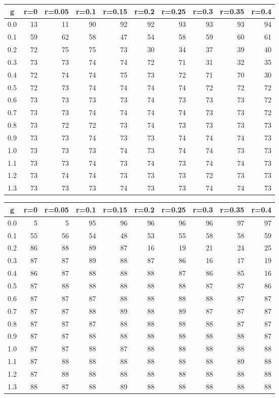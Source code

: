 %
\begin{table}[!tbp]
 \begin{center}
 \begin{tabular}{rrrrrrrrrr}\hline\hline
\multicolumn{1}{c}{g}&\multicolumn{1}{c}{r=0}&\multicolumn{1}{c}{r=0.05}&\multicolumn{1}{c}{r=0.1}&\multicolumn{1}{c}{r=0.15}&\multicolumn{1}{c}{r=0.2}&\multicolumn{1}{c}{r=0.25}&\multicolumn{1}{c}{r=0.3}&\multicolumn{1}{c}{r=0.35}&\multicolumn{1}{c}{r=0.4}\tabularnewline
\hline
0.0&13&11&90&92&92&93&93&93&94\tabularnewline
0.1&59&62&58&47&54&58&59&60&61\tabularnewline
0.2&72&75&75&73&30&34&37&39&40\tabularnewline
0.3&73&73&74&74&72&71&31&32&35\tabularnewline
0.4&72&74&74&75&73&72&71&70&30\tabularnewline
0.5&72&73&74&74&74&74&72&72&72\tabularnewline
0.6&73&73&73&73&74&73&73&73&72\tabularnewline
0.7&73&73&74&74&74&74&73&73&72\tabularnewline
0.8&73&72&72&73&74&73&73&73&73\tabularnewline
0.9&73&73&74&73&73&74&74&74&73\tabularnewline
1.0&73&73&73&74&73&74&74&73&73\tabularnewline
1.1&73&73&74&73&74&73&74&74&73\tabularnewline
1.2&73&74&74&73&73&73&72&73&73\tabularnewline
1.3&73&73&73&74&73&73&74&74&73\tabularnewline
\hline
\end{tabular}

\end{center}

\end{table}

%
\begin{table}[!tbp]
 \begin{center}
 \begin{tabular}{rrrrrrrrrr}\hline\hline
\multicolumn{1}{c}{g}&\multicolumn{1}{c}{r=0}&\multicolumn{1}{c}{r=0.05}&\multicolumn{1}{c}{r=0.1}&\multicolumn{1}{c}{r=0.15}&\multicolumn{1}{c}{r=0.2}&\multicolumn{1}{c}{r=0.25}&\multicolumn{1}{c}{r=0.3}&\multicolumn{1}{c}{r=0.35}&\multicolumn{1}{c}{r=0.4}\tabularnewline
\hline
0.0& 5& 5&95&96&96&96&96&97&97\tabularnewline
0.1&55&56&54&48&53&55&58&58&59\tabularnewline
0.2&86&88&89&87&16&19&21&24&25\tabularnewline
0.3&87&87&89&88&87&86&16&17&19\tabularnewline
0.4&86&87&88&88&88&87&86&85&16\tabularnewline
0.5&87&88&88&88&88&88&87&87&86\tabularnewline
0.6&87&87&87&88&88&88&88&87&87\tabularnewline
0.7&87&87&88&89&88&89&87&87&87\tabularnewline
0.8&87&87&87&88&88&88&88&87&87\tabularnewline
0.9&87&87&88&88&88&88&88&88&87\tabularnewline
1.0&87&87&88&87&88&88&88&88&88\tabularnewline
1.1&87&88&88&88&88&88&88&89&88\tabularnewline
1.2&87&88&88&88&88&88&88&88&88\tabularnewline
1.3&88&87&88&89&88&88&88&88&88\tabularnewline
\hline
\end{tabular}

\end{center}

\end{table}

